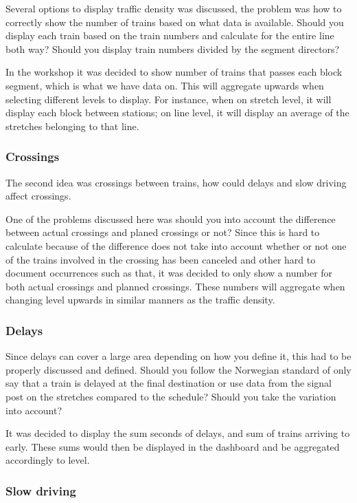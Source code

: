 Several options to display traffic density was discussed, the problem was how
to correctly show the number of trains based on what data is available. Should
you display each train based on the train numbers and calculate for the entire
line both way? Should you display train numbers divided by the segment
directors? 

In the workshop it was decided to show number of trains that passes each block
segment, which is what we have data on. This will aggregate upwards when
selecting different levels to display. For instance, when on stretch level, it
will display each block between stations; on line level, it will display an
average of the stretches belonging to that line.


\subsubsection{Crossings} %
\label{ssub:crossings}
The second idea was crossings between trains, how could delays and slow 
driving affect crossings. 

One of the problems discussed here was should you into account the difference
between actual crossings and planed crossings or not? Since this is hard to
calculate because of the difference does not take into account whether or not
one of the trains involved in the crossing has been canceled and other hard to
document occurrences such as that, it was decided to only show a number for
both actual crossings and planned crossings. These numbers will aggregate when
changing level upwards in similar manners as the traffic density. 

\subsubsection{Delays} %
\label{ssub:delays}
Since delays can cover a large area depending on how you define it, this had to
be properly discussed and defined. Should you follow the Norwegian standard
\cite{jernbaneverketPunklighetsTall} of only say that a train is delayed at the
final destination or use data from the signal post on the stretches compared to
the schedule? Should you take the variation into account?

It was decided to display the sum seconds of delays, and sum of trains
arriving to early. These sums would then be displayed in the dashboard and be
aggregated accordingly to level.


\subsubsection{Slow driving} %
\label{ssub:slow_driving}




